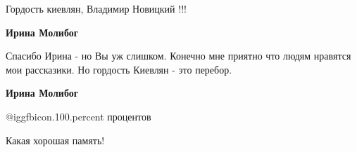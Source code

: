  
 
 
 
 

Гордость киевлян, Владимир Новицкий !!!

\textbf{Ирина Молибог} 

Спасибо Ирина - но Вы уж слишком. Конечно мне приятно что людям нравятся мои
рассказики. Но гордость Киевлян - это перебор.

\textbf{Ирина Молибог}  

@igg{fbicon.100.percent}  процентов

Какая хорошая память!
